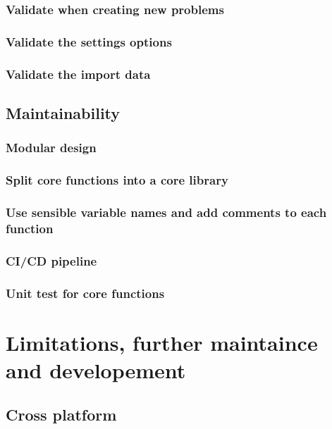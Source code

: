 \documentclass[a4paper]{report}
\begin{document}
\subsubsection{Validate when creating new problems}

\subsubsection{Validate the settings options}

\subsubsection{Validate the import data}

\subsection{Maintainability}

\subsubsection{Modular design}

\subsubsection{Split core functions into a core library}

\subsubsection{Use sensible variable
names and add comments to each function}

\subsubsection{CI/CD pipeline}

\subsubsection{Unit test for core functions}

\section{Limitations, further maintaince and developement}

\subsection{Cross platform}
\end{document}
